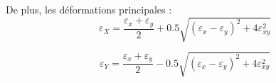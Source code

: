\documentclass[a4paper,12pt]{article}
\begin{document}
De plus, les déformations principales : \\

\begin{equation}
	\varepsilon_X = \frac{\varepsilon_x + \varepsilon_y}{2} + 0.5  \sqrt{(\varepsilon_x - \varepsilon_y)^2 + 4\varepsilon_{xy}^2}
	\label{eq:18}
\end{equation}

\begin{equation}
	\varepsilon_Y = \frac{\varepsilon_x + \varepsilon_y}{2} - 0.5  \sqrt{(\varepsilon_x - \varepsilon_y)^2 + 4\varepsilon_{xy}^2}
	\label{eq:18}
\end{equation}
\end{document}
